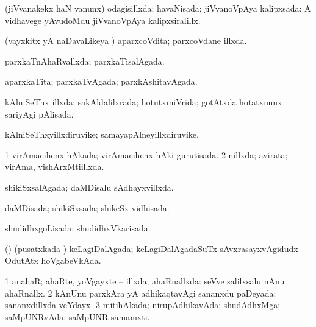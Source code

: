 {{\bentry
{} 
\gl{\gu}
\expl{}
\bmng
(jiVvanakekx haN \mo vanunx) odagisillxda; havaNisada; jiVvanoVpAya kalipxsada:  A vidhavege yAvudoMdu jiVvanoVpAya kalipxsiralillx. 
\emng
\eentry

\bentry
{} 
\gl{\gu}
\expl{}
\bmng
(vayxkitx yA naDavaLikeya \vi) aparxcoVdita; parxcoVdane illxda. 
\emng
\eentry

\bentry
{} 
\gl{\gu}
\expl{}
\bmng
parxkaTnAhaRvallxda; parxkaTisalAgada. 
\emng
\eentry

\bentry
{} 
\gl{\gu}
\expl{}
\bmng
aparxkaTita; parxkaTvAgada; parxkAshitavAgada. 
\emng
\eentry

\bentry
{} 
\gl{\gu}
\expl{}
\bmng
kAlniSeThx illxda; sakAldalilxrada; hotutxmiVrida; gotAtxda hotatxnunx sariyAgi pAlisada. 
\emng
\eentry

\bentry
{} 
\gl{\nA}
\expl{}
\bmng
kAlniSeThxyillxdiruvike; samayapAlneyillxdiruvike. 
\emng
\eentry

\bentry
{} 
\gl{\gu}
\expl{}
\bmng
\bnum
\num{1} virAmacihenx hAkada; virAmacihenx hAki gurutisada. 
\num{2} nillxda; avirata; virAma, vishArxMti{i}llxda. 
\enum
\emng
\eentry

\bentry
{} 
\gl{\gu}
\expl{}
\bmng
shikiSxsalAgada; daMDisalu sAdhayxvillxda. 
\emng
\eentry

\bentry
{} 
\gl{\gu}
\expl{}
\bmng
daMDisada; shikiSxsada; shikeSx vidhisada. 
\emng
\eentry

\bentry
{} 
\gl{\gu}
\expl{}
\bmng
shudidhxgoLisada; shudidhxVkarisada. 
\emng
\eentry

\bentry
{} 
\gl{\gu}
\expl{}
\bmng
(\AmA) (pusatxkada \vi) keLagiDalAgada; keLagiDalAgadaSuTx sAvxrasayxvAgidudx OdutAtx hoVgabeVkAda. 
\emng
\eentry

\bentry
{} 
\gl{\gu}
\expl{}
\bmng
\bnum
\num{1} anahaR; ahaRte, yoVgayxte -- illxda; ahaRnallxda:  seVve salilxsalu nAnu ahaRnallx. 
\num{2} kAnUnu parxkAra yA adhikaqtavAgi sananxdu paDeyada:  sananxdillxda veYdayx. 
\num{3} mitihAkada; nirupAdhikavAda; shudAdhxMga; saMpUNRvAda:  saMpUNR samamxti. 
\enum
\emng
\eentry

}}
